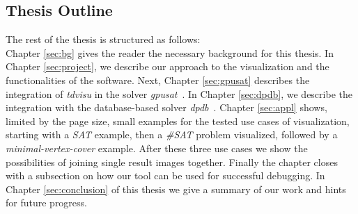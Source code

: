 \documentclass[a4paper, 12pt, bibliography=totoc]{scrartcl}
\begin{document}
%

\subsection{Thesis Outline}
The rest of the thesis is structured as follows: \\
Chapter \ref{sec:bg} gives the reader the necessary background for this thesis. In Chapter \ref{sec:project}, we describe our approach to the visualization and the functionalities of the software. Next, Chapter \ref{sec:gpusat} describes the integration of \textit{tdvisu} in the solver \textit{gpusat}~\cite{DiplomarbeitZisser}. In Chapter \ref{sec:dpdb}, we describe the integration with the database-based solver \textit{dpdb}~\cite{dpdbpadl2020}.
Chapter \ref{sec:appl} shows, limited by the page size, small examples for the tested use cases of visualization, starting with a \textit{SAT} example, then a \textit{\#SAT} problem visualized, followed by a \textit{minimal-vertex-cover} example. After these three use cases we show the possibilities of joining single result images together. Finally the chapter closes with a subsection on how our tool can be used for successful debugging. In Chapter \ref{sec:conclusion} of this thesis we give a summary of our work and hints for future progress.
\end{document}
